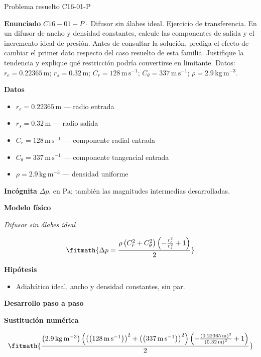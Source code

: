 \documentclass[10pt,openany]{book}
\begin{document}
\begin{studiumworked}{Problema resuelto C16-01-P}


\noindent\textbf{Enunciado}
\(C16-01-P \cdot\) Difusor sin álabes ideal. Ejercicio de transferencia. En un difusor de ancho y densidad constantes, calcule las componentes de salida y el incremento ideal de presión. Antes de consultar la solución, prediga el efecto de cambiar el primer dato respecto del caso resuelto de esta familia. Justifique la tendencia y explique qué restricción podría convertirse en limitante. Datos: \(r_e=0.22365\, \mathrm{m}\); \(r_s=0.32\, \mathrm{m}\); \(C_r=128\, \mathrm{m}\,\mathrm{s}^{-1}\); \(C_\theta=337\, \mathrm{m}\,\mathrm{s}^{-1}\); \(\rho=2.9\, \mathrm{kg}\,\mathrm{m}^{-3}\).

\noindent\textbf{Datos}
\begin{itemize}
\item $r_e = 0.22365\,\mathrm{m}$ — radio entrada
\item $r_s = 0.32\,\mathrm{m}$ — radio salida
\item $C_r = 128\,\mathrm{m}\,\mathrm{s}^{-1}$ — componente radial entrada
\item $C_\theta = 337\,\mathrm{m}\,\mathrm{s}^{-1}$ — componente tangencial entrada
\item $\rho = 2.9\,\mathrm{kg}\,\mathrm{m}^{-3}$ — densidad uniforme
\end{itemize}

\noindent\textbf{Incógnita}
$\Delta p$, en $\mathrm{Pa}$; también las magnitudes intermedias desarrolladas.

\noindent\textbf{Modelo físico}

\noindent\textit{Difusor sin álabes ideal}

\[
\fitmath{\Delta p=\frac{\rho \left(C_r^{2} + C_\theta^{2}\right) \left(- \frac{r_e^{2}}{r_s^{2}} + 1\right)}{2}}
\]

\noindent\textbf{Hipótesis}
\begin{itemize}
\item Adiabático ideal, ancho y densidad constantes, sin par.
\end{itemize}

\noindent\textbf{Desarrollo paso a paso}



\noindent\textbf{Sustitución numérica}

\[
\fitmath{\frac{\left(2.9\,\mathrm{kg}\,\mathrm{m}^{-3}\right) \left(\left(\left(128\,\mathrm{m}\,\mathrm{s}^{-1}\right)\right)^{2} + \left(\left(337\,\mathrm{m}\,\mathrm{s}^{-1}\right)\right)^{2}\right) \left(- \frac{\left(0.22365\,\mathrm{m}\right)^{2}}{\left(0.32\,\mathrm{m}\right)^{2}} + 1\right)}{2}}
\]


\end{studiumworked}
\end{document}
